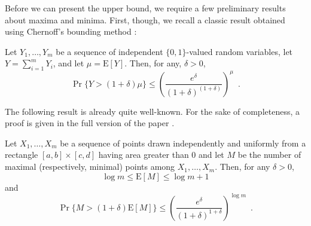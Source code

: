 \documentclass[10pt]{llncs}
\newcommand{\PROB}{\Pr}
\newcommand{\EXP}{\mathrm{E}}
\begin{document}
Before we can present the upper bound, we require a few preliminary results
about maxima and minima.  First, though, we recall a classic result 
obtained using Chernoff's bounding method \cite{c52}:

\begin{lem}
Let $Y_1,\ldots,Y_m$ be a sequence of independent $\{0,1\}$-valued
random variables, let $Y=\sum_{i=1}^m Y_i$, and let $\mu=\EXP[Y]$.
Then, for any, $\delta > 0$,
\[
   \Pr\{Y > (1+\delta)\mu\} 
     \le \left(\frac{e^{\delta}}{(1+\delta)^{(1+\delta)}}\right)^{\mu}
	\enspace .
\]
\end{lem}


The following result is already quite well-known.  For the sake of
completeness, a proof is given in the full version of the paper
\cite{dgm09}.

\begin{lem}
  Let $X_1,\ldots,X_m$ be a sequence of points drawn independently and
  uniformly from a rectangle $[a,b]\times[c,d]$ having area greater than
  0 and let $M$ be the number of maximal (respectively, minimal) points
  among $X_1,\ldots,X_m$.  Then, for any $\delta >0$,
  \begin{equation}
    \log m \le \EXP[M] \le \log m + 1
  \end{equation}
  and 
  \begin{equation}
    \PROB\{M>(1+\delta)\EXP[M]\} 
        \le \left(\frac{e^\delta}{(1+\delta)^{1+\delta}}\right)^{\log m}
		 \enspace .
  \end{equation}
\end{lem}

%
\end{document}
